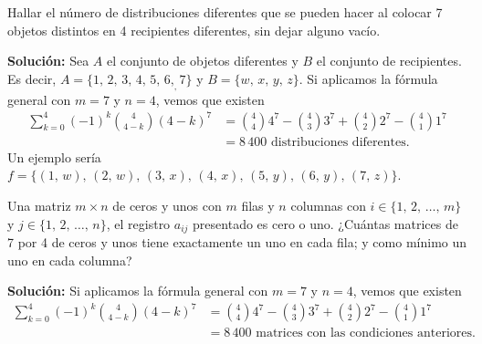 \begin{myexample}
    Hallar el número de distribuciones diferentes que se pueden hacer al colocar 7 objetos distintos en 4 recipientes diferentes, sin dejar alguno vacío.

    \tcblower
    \textbf{\color{jblueleft}Solución:} Sea $A$ el conjunto de objetos diferentes y $B$ el conjunto de recipientes. Es decir, $A = \{1, \, 2, \, 3, \, 4, \, 5, \, 6, _, 7\}$ y $B = \{w, \, x, \, y, \, z\}$. Si aplicamos la fórmula general con $m = 7$ y $n = 4$, vemos que existen
    \begin{align*}
        \sum_{k=0}^4 (-1)^k \binom{4}{4-k} (4-k)^7 & = \binom{4}{4} 4^7 - \binom{4}{3} 3^7 + \binom{4}{2} 2^7 - \binom{4}{1} 1^7 \\
        & = 8 \, 400 \text{ distribuciones diferentes.}
    \end{align*}
    Un ejemplo sería $f = \{ (1, \, w), \, (2, \, w), \, (3, \, x), \, (4, \, x), \, (5, \, y), \, (6, \, y), \, (7, \, z) \}$.
\end{myexample}

\newpage

\begin{myexample}
    Una matriz $m \times n$ de ceros y unos con $m$ filas y $n$ columnas con $i \in \{1, \, 2, \, \dots, \, m\}$ y $j \in \{1, \, 2, \, \dots, \, n\}$, el registro $a_{ij}$ presentado es cero o uno. ¿Cuántas matrices de 7 por 4 de ceros y unos tiene exactamente un uno en cada fila; y como mínimo un uno en cada columna?

    \tcblower
    \textbf{\color{jblueleft}Solución:} Si aplicamos la fórmula general con $m = 7$ y $n = 4$, vemos que existen
    \begin{align*}
        \sum_{k=0}^4 (-1)^k \binom{4}{4-k} (4-k)^7 & = \binom{4}{4} 4^7 - \binom{4}{3} 3^7 + \binom{4}{2} 2^7 - \binom{4}{1} 1^7 \\
        & = 8 \, 400 \text{ matrices con las condiciones anteriores.}
    \end{align*}
\end{myexample}

